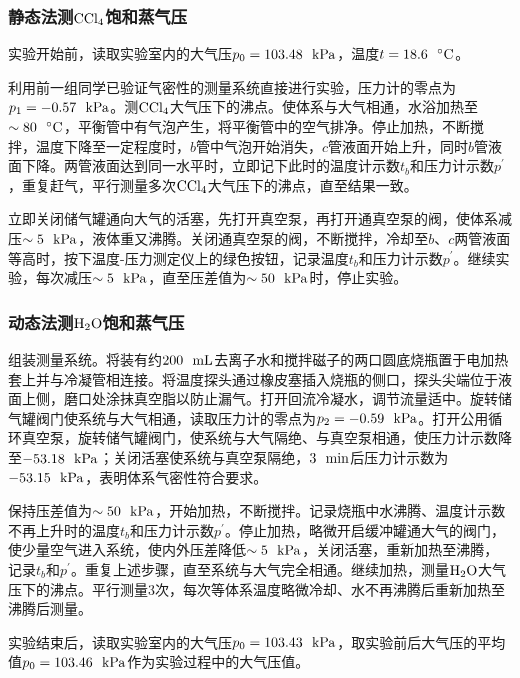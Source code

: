 \documentclass[12pt]{article}
\begin{document}
			\subsubsection{静态法测$\rm CCl_{4}$饱和蒸气压}
实验开始前，读取实验室内的大气压$p_{0}=103.48\ \ {\rm kPa}$，温度$t=18.6\ \ {\rm ^{\circ}C}$。\par
利用前一组同学已验证气密性的测量系统直接进行实验，压力计的零点为$p_{1}=-0.57\ \ {\rm kPa}$。测$\rm CCl_{4}$大气压下的沸点。使体系与大气相通，水浴加热至$\sim 80\ \ {\rm ^{\circ}C}$，平衡管中有气泡产生，将平衡管中的空气排净。停止加热，不断搅拌，温度下降至一定程度时，$b$管中气泡开始消失，$c$管液面开始上升，同时$b$管液面下降。两管液面达到同一水平时，立即记下此时的温度计示数$t_{b}$和压力计示数$p^{\prime}$，重复赶气，平行测量多次$\rm CCl_{4}$大气压下的沸点，直至结果一致。\par 
立即关闭储气罐通向大气的活塞，先打开真空泵，再打开通真空泵的阀，使体系减压$\sim 5\ \ {\rm kPa}$，液体重又沸腾。关闭通真空泵的阀，不断搅拌，冷却至$b$、$c$两管液面等高时，按下温度-压力测定仪上的绿色按钮，记录温度$t_{b}$和压力计示数$p^{\prime}$。继续实验，每次减压$\sim 5\ \ {\rm kPa}$，直至压差值为$\sim 50\ \ {\rm kPa}$时，停止实验。

\subsubsection{动态法测$\rm H_{2}O$饱和蒸气压}
组装测量系统。将装有约$200\ \ {\rm mL}$去离子水和搅拌磁子的两口圆底烧瓶置于电加热套上并与冷凝管相连接。将温度探头通过橡皮塞插入烧瓶的侧口，探头尖端位于液面上侧，磨口处涂抹真空脂以防止漏气。打开回流冷凝水，调节流量适中。旋转储气罐阀门使系统与大气相通，读取压力计的零点为$p_{2}=-0.59\ \ {\rm kPa}$。打开公用循环真空泵，旋转储气罐阀门，使系统与大气隔绝、与真空泵相通，使压力计示数降至$-53.18\ \ {\rm kPa}$；关闭活塞使系统与真空泵隔绝，$3\ \ {\rm min}$后压力计示数为$-53.15\ \ {\rm kPa}$，表明体系气密性符合要求。\par
保持压差值为$\sim 50\ \ {\rm kPa}$，开始加热，不断搅拌。记录烧瓶中水沸腾、温度计示数不再上升时的温度$t_{b}$和压力计示数$p^{\prime}$。停止加热，略微开启缓冲罐通大气的阀门，使少量空气进入系统，使内外压差降低$\sim 5\ \ {\rm kPa}$，关闭活塞，重新加热至沸腾，记录$t_{b}$和$p^{\prime}$。重复上述步骤，直至系统与大气完全相通。继续加热，测量$\rm H_{2}O$大气压下的沸点。平行测量3次，每次等体系温度略微冷却、水不再沸腾后重新加热至沸腾后测量。\par 
实验结束后，读取实验室内的大气压$p_{0}=103.43\ \ {\rm kPa}$，取实验前后大气压的平均值$p_{0}=103.46\ \ {\rm kPa}$作为实验过程中的大气压值。   			
\end{document}
